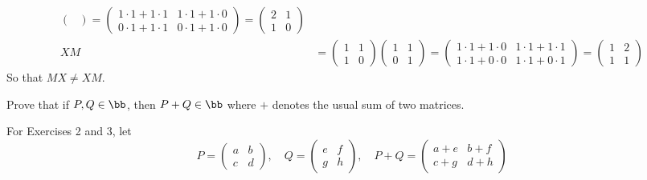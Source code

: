 \begin{problems}
\begin{sol}
\begin{align*}
\begin{pmatrix}
            \end{pmatrix} =
            \begin{pmatrix}
                1 \cdot 1 + 1 \cdot 1 & 1 \cdot 1 + 1 \cdot 0 \\
                0 \cdot 1 + 1 \cdot 1 & 0 \cdot 1 + 1 \cdot 0
            \end{pmatrix} =
            \begin{pmatrix}
                2 & 1 \\
                1 & 0
            \end{pmatrix} \\
            XM & = 
            \begin{pmatrix}
                1 & 1 \\
                1 & 0
            \end{pmatrix}
            \begin{pmatrix}
                1 & 1 \\
                0 & 1
            \end{pmatrix} = 
            \begin{pmatrix}
                1 \cdot 1 + 1 \cdot 0 & 1 \cdot 1 + 1 \cdot 1 \\
                1 \cdot 1 + 0 \cdot 0 & 1 \cdot 1 + 0 \cdot 1
            \end{pmatrix} = 
            \begin{pmatrix}
                1 & 2 \\
                1 & 1
            \end{pmatrix}
        \end{align*}
        So that $MX \neq XM$.
    \end{sol}
    \item Prove that if $P, Q \in \bb$, then $P + Q \in \bb$ where $+$ denotes the usual sum of two matrices.
    \begin{sol}
        For Exercises 2 and 3, let
        \[P = 
        \begin{pmatrix}
            a & b \\
            c & d
        \end{pmatrix}, \quad Q = 
        \begin{pmatrix}
            e & f \\
            g & h
        \end{pmatrix}, \quad P + Q = 
        \begin{pmatrix}
            a + e & b + f \\
            c + g & d + h

\end{pmatrix}\]
\end{sol}
\end{problems}
